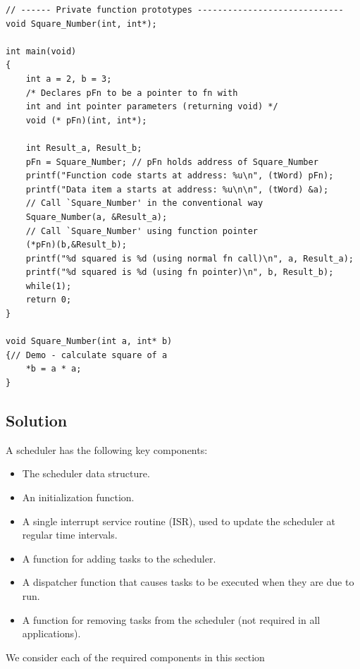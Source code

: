 \documentclass[twoside, final]{hcmut_report}
\begin{document}
\begin{lstlisting}[basicstyle=\small, caption=Example of how to use function pointers]
// ------ Private function prototypes -----------------------------
void Square_Number(int, int*);

int main(void)
{
    int a = 2, b = 3; 
    /* Declares pFn to be a pointer to fn with 
    int and int pointer parameters (returning void) */
    void (* pFn)(int, int*);
    
    int Result_a, Result_b;
    pFn = Square_Number; // pFn holds address of Square_Number
    printf("Function code starts at address: %u\n", (tWord) pFn);
    printf("Data item a starts at address: %u\n\n", (tWord) &a);
    // Call `Square_Number' in the conventional way
    Square_Number(a, &Result_a);
    // Call `Square_Number' using function pointer
    (*pFn)(b,&Result_b);
    printf("%d squared is %d (using normal fn call)\n", a, Result_a); 
    printf("%d squared is %d (using fn pointer)\n", b, Result_b); 
    while(1);
    return 0;
}

void Square_Number(int a, int* b)
{// Demo - calculate square of a
    *b = a * a;
}
\end{lstlisting}

\subsection{Solution}
A scheduler has the following key components:
\begin{itemize}
    \item  The scheduler data structure.
    \item  An initialization function.
    \item  A single interrupt service routine (ISR), used to update the scheduler at regular time
    intervals.
    \item  A function for adding tasks to the scheduler.
    \item  A dispatcher function that causes tasks to be executed when they are due to run.
    \item  A function for removing tasks from the scheduler (not required in all applications).
\end{itemize}

We consider each of the required components in this section
\end{document}
